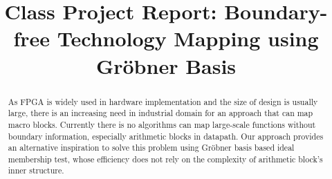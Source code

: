 \documentclass[conference,10pt]{IEEEtran}
\begin{document}

\title{Class Project Report: Boundary-free Technology Mapping using Gr\"obner Basis}

\author{
}

%
 
\maketitle

\newcommand{\Fq}{{\mathbb{F}}_{q}}
\newcommand{\Fkk}{{\mathbb{F}}_{2^k}}
\newcommand{\Fkkx}[1][x]{\ensuremath{\mathbb{F}}_{2^k}[#1]\xspace}
\newcommand{\Grobner}{Gr\"{o}bner\xspace}
\newcommand{\B}{{\mathbb{B}}}
\newcommand{\Z}{{\mathbb{Z}}}
\newcommand{\F}{{\mathcal{F}}}
\newcommand{\G}{{\mathcal{G}}}
\newcommand{\R}{\mathbb{R}}

\newcommand{\debug}[1]{\textcolor{gray}{[ #1 ]}}



\begin{abstract}
As FPGA is widely used in hardware implementation and the size of design is usually large, there 
is an increasing need in industrial domain for an approach that can map macro blocks. Currently
there is no algorithms can map large-scale functions without boundary information, especially
arithmetic blocks in datapath. Our approach provides an alternative inspiration to solve
this problem using Gr\"obner basis based ideal membership test, whose efficiency does not
rely on the complexity of arithmetic block's inner structure.
\end{abstract}
\end{document}
